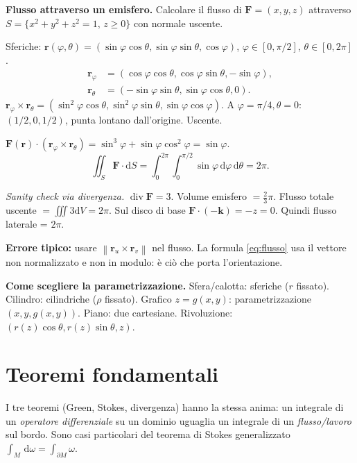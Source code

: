 \documentclass[11pt,a4paper,openany]{book}
\theoremstyle{plain}
\theoremstyle{definition}
\theoremstyle{remark}
\newcommand{\dd}{\,\mathrm{d}}
\newcommand{\Div}{\operatorname{div}}
\renewcommand{\vec}[1]{\mathbf{#1}}
\newcommand{\F}{\mathbf{F}}
\newcommand{\rr}{\mathbf{r}}
\newcommand{\dS}{\mathrm{d}S}
\newcommand{\dV}{\mathrm{d}V}
\newcommand{\norm}[1]{\left\lVert #1 \right\rVert}
\begin{document}
\begin{esempio}
\textbf{Flusso attraverso un emisfero.} Calcolare il flusso di
$\F=(x,y,z)$ attraverso $S=\{x^2+y^2+z^2=1,\,z\ge 0\}$ con normale uscente.

Sferiche: $\rr(\varphi,\theta)=(\sin\varphi\cos\theta,\sin\varphi\sin\theta,\cos\varphi)$,
$\varphi\in[0,\pi/2]$, $\theta\in[0,2\pi]$.
\begin{align*}
\rr_\varphi&=(\cos\varphi\cos\theta,\cos\varphi\sin\theta,-\sin\varphi),\\
\rr_\theta&=(-\sin\varphi\sin\theta,\sin\varphi\cos\theta,0).
\end{align*}
$\rr_\varphi\times\rr_\theta=(\sin^2\varphi\cos\theta,\sin^2\varphi\sin\theta,\sin\varphi\cos\varphi)$.
A $\varphi=\pi/4,\theta=0$: $(1/2,0,1/2)$, punta lontano dall'origine. Uscente.

$\F(\rr)\cdot(\rr_\varphi\times\rr_\theta)=\sin^3\varphi+\sin\varphi\cos^2\varphi=\sin\varphi$.
\[
  \iint_S\F\cdot\dS=\int_0^{2\pi}\int_0^{\pi/2}\sin\varphi\dd\varphi\dd\theta=2\pi.
\]

\textsl{Sanity check via divergenza.} $\Div\F=3$. Volume emisfero
$=\frac23\pi$. Flusso totale uscente $=\iiint 3\dV=2\pi$. Sul disco di base
$\F\cdot(-\vec{k})=-z=0$. Quindi flusso laterale = $2\pi$. \checkmark
\end{esempio}

\begin{trappola}
\textbf{Errore tipico:} usare $\norm{\rr_u\times\rr_v}$ nel flusso. La formula
\eqref{eq:flusso} usa il vettore non normalizzato e non in modulo: \`e ci\`o
che porta l'orientazione.
\end{trappola}

\begin{nota}
\textbf{Come scegliere la parametrizzazione.}
Sfera/calotta: sferiche ($r$ fissato). Cilindro: cilindriche ($\rho$ fissato).
Grafico $z=g(x,y)$: parametrizzazione $(x,y,g(x,y))$. Piano: due cartesiane.
Rivoluzione: $(r(z)\cos\theta,r(z)\sin\theta,z)$.
\end{nota}

\chapter{Teoremi fondamentali}

I tre teoremi (Green, Stokes, divergenza) hanno la stessa anima: un integrale
di un \emph{operatore differenziale} su un dominio uguaglia un integrale di
un \emph{flusso/lavoro} sul bordo. Sono casi particolari del teorema di
Stokes generalizzato $\int_M\dd\omega=\int_{\partial M}\omega$.
\end{document}
